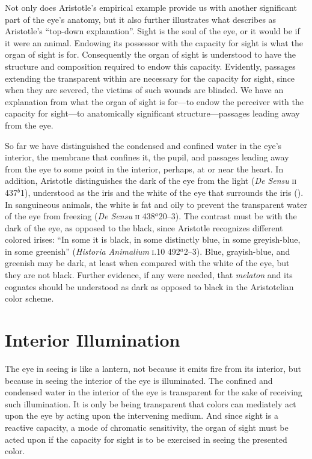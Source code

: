 Not only does Aristotle's empirical example provide us with another significant part of the eye's anatomy, but it also further illustrates what \citet{Johansen:1997zr} describes as Aristotle's ``top-down explanation''. Sight is the soul of the eye, or it would be if it were an animal. Endowing its possessor with the capacity for sight is what the organ of sight is for. Consequently the organ of sight is understood to have the structure and composition required to endow this capacity. Evidently, passages extending the transparent within are necessary for the capacity for sight, since when they are severed, the victims of such wounds are blinded. We have an explanation from what the organ of sight is for---to endow the perceiver with the capacity for sight---to anatomically significant structure---passages leading away from the eye.

So far we have distinguished the condensed and confined water in the eye's interior, the membrane that confines it, the pupil, and passages leading away from the eye to some point in the interior, perhaps, at or near the heart. In addition, Aristotle distinguishes the dark of the eye from the light (\emph{De Sensu} \textsc{ii} 437\( ^{b} \)1), understood as the iris and the white of the eye that surrounds the iris (\citealt[see][218, 231 n13]{Lloyd:1978fk}). In sanguineous animals, the white is fat and oily to prevent the transparent water of the eye from freezing (\emph{De Sensu} \textsc{ii} 438\( ^{a} \)20--3). The contrast must be with the dark of the eye, as opposed to the black, since Aristotle recognizes different colored irises: ``In some it is black, in some distinctly blue, in some greyish-blue, in some greenish'' (\emph{Historia Animalium} \textsc{i}.10 492\( ^{a} \)2--3). Blue, grayish-blue, and greenish may be dark, at least when compared with the white of the eye, but they are not black. Further evidence, if any were needed, that \emph{melaton} and its cognates should be understood as dark as opposed to black in the Aristotelian color scheme.


\section{Interior Illumination} %
\label{sec:interior_illumination}

The eye in seeing is like a lantern, not because it emits fire from its interior, but because in seeing the interior of the eye is illuminated. The confined and condensed water in the interior of the eye is transparent for the sake of receiving such illumination. It is only be being transparent that colors can mediately act upon the eye by acting upon the intervening medium. And since sight is a reactive capacity, a mode of chromatic sensitivity, the organ of sight must be acted upon if the capacity for sight is to be exercised in seeing the presented color.


